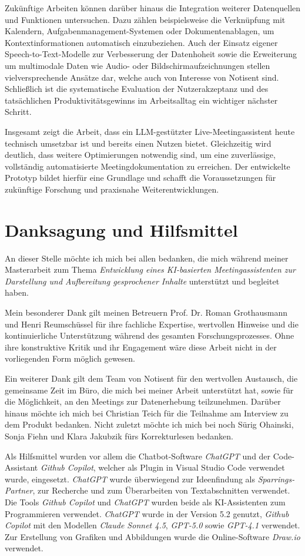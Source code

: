 Zukünftige Arbeiten können darüber hinaus die Integration weiterer Datenquellen und Funktionen untersuchen. Dazu zählen beispielsweise die Verknüpfung mit Kalendern, Aufgabenmanagement-Systemen oder Dokumentenablagen, um Kontextinformationen automatisch einzubeziehen. Auch der Einsatz eigener Speech-to-Text-Modelle zur Verbesserung der Datenhoheit sowie die Erweiterung um multimodale Daten wie Audio- oder Bildschirmaufzeichnungen stellen vielversprechende Ansätze dar, welche auch von Interesse von Notisent sind. Schließlich ist die systematische Evaluation der Nutzerakzeptanz und des tatsächlichen Produktivitätsgewinns im Arbeitsalltag ein wichtiger nächster Schritt.

Insgesamt zeigt die Arbeit, dass ein LLM-gestützter Live-Meetingassistent heute technisch umsetzbar ist und bereits einen Nutzen bietet. Gleichzeitig wird deutlich, dass weitere Optimierungen notwendig sind, um eine zuverlässige, vollständig automatisierte Meetingdokumentation zu erreichen. Der entwickelte Prototyp bildet hierfür eine   Grundlage und schafft die Voraussetzungen für zukünftige Forschung und praxisnahe Weiterentwicklungen.


\chapter{Danksagung und Hilfsmittel}
\label{sec:hilfsmittel}
An dieser Stelle möchte ich mich bei allen bedanken, die mich während meiner Masterarbeit zum Thema \textit{Entwicklung eines KI-basierten Meetingassistenten zur Darstellung und Aufbereitung gesprochener Inhalte} unterstützt und begleitet haben.

Mein besonderer Dank gilt meinen Betreuern Prof. Dr. Roman Grothausmann und Henri Reumschüssel für ihre fachliche Expertise, wertvollen Hinweise und die kontinuierliche Unterstützung während des gesamten Forschungsprozesses. Ohne ihre konstruktive Kritik und ihr Engagement wäre diese Arbeit nicht in der vorliegenden Form möglich gewesen.

Ein weiterer Dank gilt dem Team von Notisent für den wertvollen Austausch, die gemeinsame Zeit im Büro, die mich bei meiner Arbeit unterstützt hat, sowie für die Möglichkeit, an den Meetings zur Datenerhebung teilzunehmen. Darüber hinaus möchte ich mich bei Christian Teich für die Teilnahme am Interview zu dem Produkt bedanken. Nicht zuletzt möchte ich mich bei noch Sürig Ohainski, Sonja Fiehn und Klara Jakubzik fürs Korrekturlesen bedanken.

Als Hilfsmittel wurden vor allem die Chatbot-Software \textit{ChatGPT} und der Code-Assistant \textit{Github Copilot}, welcher als Plugin in Visual Studio Code verwendet wurde, eingesetzt. \textit{ChatGPT} wurde überwiegend zur Ideenfindung als \textit{Sparrings-Partner}, zur Recherche und zum Überarbeiten von Textabschnitten verwendet. Die Tools \textit{Github Copilot} und \textit{ChatGPT} wurden beide als KI-Assistenten zum Programmieren verwendet. \textit{ChatGPT} wurde in der Version 5.2 genutzt, \textit{Github Copilot} mit den Modellen \textit{Claude Sonnet 4.5}, \textit{GPT-5.0} sowie \textit{GPT-4.1} verwendet.
Zur Erstellung von Grafiken und Abbildungen wurde die Online-Software \textit{Draw.io} verwendet.